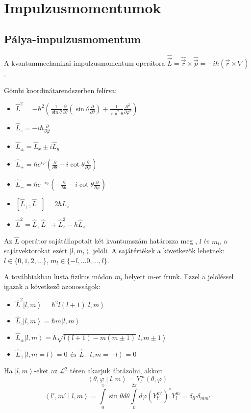 \documentclass[12pt]{article}
\theoremstyle{plain}
\newcommand{\ket}[1]{\left| #1 \right >}
\newcommand{\bracket}[2]{\left < #1 \middle | #2 \right>}
\newcommand{\commut}[2]{\left [ #1 , #2 \right]}
\begin{document}
\section{Impulzusmomentumok}
\subsection{Pálya-impulzusmomentum}
A kvantummechanikai impulzusmomentum operátora $\hat{\vec L} = \hat{\vec r} \times \hat{\vec p} = -i \hbar (\vec r \times \nabla)$.

Gömbi koordinátarendszerben felírva:
\begin{itemize}
    \item $
        \hat L^2 = -\hbar^2 \left(\frac{1}{\sin \theta} \frac{\partial}{\partial \theta} \left(\sin\theta\frac{\partial}{\partial \theta}\right) 
        + \frac{1}{\sin^2 \theta}\frac{\partial^2}{\partial\varphi^2}\right)
    $
    \item $
        \hat L_z = -i\hbar \frac{\partial}{\partial\varphi}
    $
    \item $
      \hat L_{\pm} = \hat L_x \pm i \hat L_y
    $
    \item $
        \hat L_+ = \hbar e^{i\varphi} \left( \frac{\partial}{\partial \theta} - i \cot\theta \frac{\partial}{\partial \varphi}\right)
    $
    \item $
        \hat L_- = \hbar e^{-i\varphi} \left( - \frac{\partial}{\partial \theta} - i \cot\theta \frac{\partial}{\partial \varphi}\right)
    $
    \item $
        \commut{\hat L_+}{\hat L_-} = 2 \hbar L_z
    $
    \item $
        \hat L^2 = \hat L_+ \hat L_- + \hat L_z^2 - \hbar \hat L_z
    $
\end{itemize}
Az $\hat L$ operátor sajátállapotait két kvantumszám határozza meg , $l$ és $m_l$, a sajátvektorokat ezért $\ket{l,m_l}$ jelöli.
A sajátértékek a következők lehetnek: $l\in \{0,1,2, ...\}$, $m_l \in \{-l,... 0, ..., l\}$.

A továbbiakban lusta fizikus módon $m_l$ helyett $m$-et írunk.
Ezzel a jelöléssel igazak a következő azonosságok:
\begin{itemize}
    \item $
        \hat L^2 \ket{l, m} = \hbar^2 l (l+1) \ket{l,m}
    $
    \item $
        \hat L_z \ket{l, m} = \hbar m \ket{l,m}
    $
    \item $
      \hat L_{\pm}\ket{l, m} = \hbar \sqrt{l(l+1) - m(m\pm1)}\ket{l,m\pm 1}
    $
    \item $
        \hat L_+ \ket{l,m=l} = 0 ~~ \textrm{és} ~~ \hat L_- \ket{l,m=-l} = 0
    $
\end{itemize}
Ha $\ket{l,m}$-eket az $\mathcal{L}^2$ téren akarjuk ábrázolni, akkor:
\[
    \bracket{\theta, \varphi}{l,m} = Y^m_l(\theta, \varphi)
\]
\[
   \bracket{l',m'}{l,m} = \int \limits_0^{\pi}\sin\theta d \theta \int \limits_0^{2\pi}d \varphi (Y^{m'}_{l'})^{*} Y^m_l = \delta_{ll'}\delta_{mm'}
\]
\end{document}
